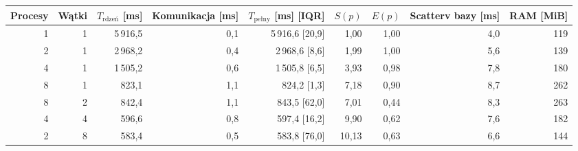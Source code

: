 \begin{tabular}{rrrrrrrrr}
\toprule
Procesy & Wątki & $T_\text{rdzeń}$ [ms] & Komunikacja [ms] & $T_\text{pełny}$ [ms] [IQR] & $S(p)$ & $E(p)$ & Scatterv bazy [ms] & RAM [MiB] \\
\midrule
1 & 1 & 5\,916,5 & 0,1 & 5\,916,6 [20,9] & 1,00 & 1,00 & 4,0 & 119 \\
2 & 1 & 2\,968,2 & 0,4 & 2\,968,6 [8,6] & 1,99 & 1,00 & 5,6 & 139 \\
4 & 1 & 1\,505,2 & 0,6 & 1\,505,8 [6,5] & 3,93 & 0,98 & 7,8 & 180 \\
8 & 1 & 823,1 & 1,1 & 824,2 [1,3] & 7,18 & 0,90 & 8,7 & 262 \\
8 & 2 & 842,4 & 1,1 & 843,5 [62,0] & 7,01 & 0,44 & 8,3 & 263 \\
4 & 4 & 596,6 & 0,8 & 597,4 [16,2] & 9,90 & 0,62 & 7,6 & 182 \\
2 & 8 & 583,4 & 0,5 & 583,8 [76,0] & 10,13 & 0,63 & 6,6 & 144 \\
\bottomrule
\end{tabular}
